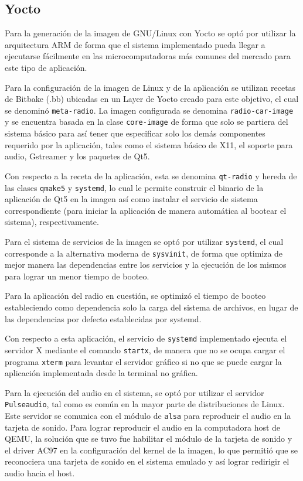 \subsection{Yocto}
\label{sec:yocto}
Para la generación de la imagen de GNU/Linux con Yocto se optó por utilizar la
arquitectura ARM de forma que el sistema implementado pueda llegar a ejecutarse
fácilmente en las microcomputadoras más comunes del mercado para este tipo de
aplicación.

Para la configuración de la imagen de Linux y de la aplicación se utilizan
recetas de Bitbake (.bb) ubicadas en un Layer de Yocto creado para este objetivo, el cual
se denominó \texttt{meta-radio}. La imagen configurada se denomina
\texttt{radio-car-image} y se encuentra basada en la clase \texttt{core-image}
de forma que solo se partiera del sistema básico para así tener que especificar solo los demás
componentes requerido por la aplicación, tales como el sistema básico de X11, el
soporte para audio, Gstreamer y los paquetes de Qt5.

Con respecto a la receta de la aplicación, esta se denomina \texttt{qt-radio} y
hereda de las clases \texttt{qmake5} y \texttt{systemd}, lo cual le permite
construir el binario de la aplicación de Qt5 en la imagen así como instalar el servicio de sistema
correspondiente (para iniciar la aplicación de manera automática al bootear el sistema), respectivamente.

Para el sistema de servicios de la imagen se optó por utilizar \texttt{systemd},
el cual corresponde a la alternativa moderna de \texttt{sysvinit}, de forma que
optimiza de mejor manera las dependencias entre los servicios y la ejecución de
los mismos para lograr un menor tiempo de booteo.

Para la aplicación del radio en cuestión, se optimizó el tiempo de booteo
estableciendo como dependencia solo la carga del sistema de archivos, en lugar
de las dependencias por defecto establecidas por systemd.

Con respecto a esta aplicación, el servicio de \texttt{systemd} implementado
ejecuta el servidor X mediante el comando \texttt{startx}, de manera que no se
ocupa cargar el programa \texttt{xterm} para levantar el servidor gráfico si no
que se puede cargar la aplicación implementada desde la terminal no gráfica.

Para la ejecución del audio en el sistema, se optó por utilizar el servidor
\texttt{Pulseaudio}, tal como es común en la mayor parte de distribuciones de
Linux. Este servidor se comunica con el módulo de \texttt{alsa} para reproducir
el audio en la tarjeta de sonido. Para lograr reproducir el audio en la
computadora host de QEMU, la solución que se tuvo fue habilitar el módulo de la
tarjeta de sonido y el driver AC97 en la configuración del kernel de la imagen,
lo que permitió que se reconociera una tarjeta de sonido en el sistema emulado y
así lograr redirigir el audio hacia el host.

